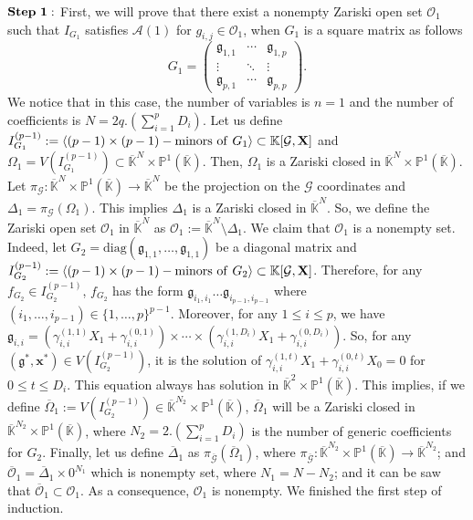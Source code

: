 \documentclass[11pt]{article}
\numberwithin{Property}{section}
\numberwithin{Theorem}{section}
\numberwithin{Proposition}{section}
\numberwithin{Lemma}{section}
\numberwithin{Corollary}{section}
\numberwithin{Definition}{section}
\numberwithin{Remark}{section}
\numberwithin{Conjecture}{section}
\numberwithin{Problem}{section}
\numberwithin{Example}{section}
\numberwithin{Claim}{section}
\renewcommand{\leq}{\leqslant}
\def\bar{\overline}
\newcommand{\field}{\mathbb{K}} %
\newcommand{\mat}[1]{\mathbf{\MakeUppercase{#1}}} %
\begin{document}
$\bf{Step \ 1:}$ First, we will prove that there exist a nonempty Zariski open set  $\mathcal{O}_1$ such that $I_{G_1}$ satisfies $\mathcal{A}(1)$ for $g_{i,j} \in\mathcal{O}_1$, when $G_1$ is a square matrix as follows
\[
G_1 = \left( \begin{matrix}
\mathfrak{g}_{1,1}  & \cdots  & \mathfrak{g}_{1, p}\\
\vdots & \ddots & \vdots \\
\mathfrak{g}_{p,1} & \cdots  & \mathfrak{g}_{p, p}
\end{matrix} \right).
\] We notice that in this case, the number of variables is $n=1$ and the number of coefficients is $N = 2q.(\sum_{i=1}^pD_i)$. Let us define $I_{G_1}^{(p-1)} := \langle (p-1) \times (p-1) - \mathrm{minors \ of \ } G_1 \rangle \subset  \field[\mathcal{G}, \mat{X}]$ and $\Omega_1 = V(I_{G_1}^{(p-1)}) \subset \bar{\field}^{N} \times \mathbb{P}^{1}(\bar{\field})$. Then, $\Omega_1$ is a Zariski closed in $\bar{\field}^{N} \times \mathbb{P}^{1}(\bar{\field})$. Let $\pi_{\mathcal{G}} : \bar{\field}^{N} \times \mathbb{P}^{1}(\bar{\field}) \to \bar{\field}^{N}$ be the projection on the $\mathcal{G}$ coordinates and $\Delta_1 = \pi_{\mathcal{G}}(\Omega_1)$. This implies $\Delta_1$ is a Zariski closed in $\bar{\field}^{N}$. So, we define the Zariski open set $\mathcal{O}_1$ in $\bar{\field}^{N}$ as $\mathcal{O}_1 := \bar{\field}^{N} \setminus \Delta_1$. We claim that $\mathcal{O}_1$ is a nonempty set. Indeed, let $G_2 = \mathrm{diag}(\mathfrak{g}_{1,1}, \ldots, \mathfrak{g}_{1,1})$ be a diagonal matrix and $I_{G_2}^{(p-1)} := \langle (p-1) \times (p-1) - \mathrm{minors \ of \ } G_2 \rangle \subset  \field[\mathcal{G}, \mat{X}]$. Therefore, for any $f_{G_2} \in I_{G_2}^{(p-1)}$, $f_{G_2}$ has the form $\mathfrak{g}_{i_1, i_1} \ldots \mathfrak{g}_{i_{p-1}, i_{p-1}}$ where $(i_1, \ldots, i_{p-1}) \in \{1, \ldots, p\}^{p-1}$. Moreover, for any $1 \leq i \leq p$, we have $\mathfrak{g}_{i,i} = (\gamma_{i,i}^{(1,1)}X_1 + \gamma_{i,i}^{(0,1)}) \times \cdots \times (\gamma_{i,i}^{(1,D_i)}X_1 + \gamma_{i,i}^{(0,D_i)})$. So, for any $(\mathfrak{g}^*, \mathbf{x}^*) \in V(I_{G_2}^{(p-1)})$, it is the solution of $\gamma_{i,i}^{(1,t)}X_1 + \gamma_{i,i}^{(0,t)}X_0 = 0$ for $0 \leq t \leq D_i$. This equation always has solution in $\bar{\field}^{2} \times \mathbb{P}^{1}(\bar{\field})$. This implies, if we define $\bar{\Omega}_1 := V(I_{G_2}^{(p-1)}) \in \bar{\field}^{N_2} \times \mathbb{P}^{1}(\bar{\field})$,  $\bar{\Omega}_1$ will be a Zariski closed in $\bar{\field}^{N_2} \times \mathbb{P}^{1}(\bar{\field})$, where $N_2 = 2.(\sum_{i = 1}^pD_i)$ is the number of generic coefficients for $G_2$. Finally, let us define $\bar{\Delta}_1$ as $\pi_{\bar{\mathcal{G}}}(\bar{\Omega}_1)$, where $\pi_{\bar{\mathcal{G}}} : \bar{\field}^{N_2} \times \mathbb{P}^{1}(\bar{\field}) \to \bar{\field}^{N_2}$; and $\bar{\mathcal{O}}_1 = \bar{\Delta}_1\times 0^{N_1}$ which is nonempty set, where $N_1 = N - N_2$; and it can be saw that 
$\bar{\mathcal{O}}_1 \subset \mathcal{O}_1$. As a consequence,  $\mathcal{O}_1$ is nonempty. We finished the first step of induction. 
\end{document}

